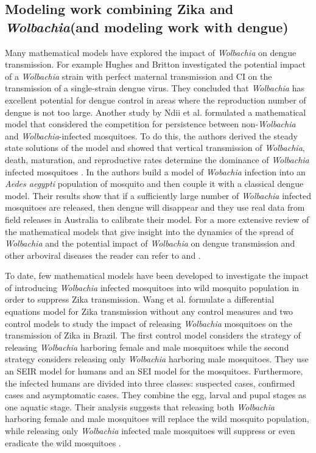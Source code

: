 \documentclass{ws-rv9x6}
\begin{document}
\subsection{Modeling work combining Zika and \textit{Wolbachia}(and modeling work with dengue)}
Many mathematical models have explored the impact of \textit{Wolbachia} on dengue transmission. For example Hughes and Britton \cite{hughes2013modelling} investigated the potential impact of a \textit{Wolbachia} strain with perfect maternal transmission and CI on the transmission of a single-strain dengue virus. They concluded that \textit{Wolbachia} has excellent potential for dengue control in areas where the reproduction number of dengue is not too large. Another study by Ndii et al. formulated a mathematical model that considered the competition for persistence between non-\textit{Wolbachia} and \textit{Wolbachia}-infected mosquitoes. To do this, the authors derived the steady state solutions of the model and showed that vertical transmission of \textit{Wolbachia}, death, maturation, and reproductive rates determine the dominance of \textit{Wolbachia} infected mosquitoes \cite{ndii2012modelling}. In \cite{koiller2014aedes} the authors build a model of \textit{Wobachia} infection into an \textit{Aedes aegypti} population of mosquito and then couple it with a classical dengue model. Their results show that if a sufficiently large number of \textit{Wolbachia} infected mosquitoes are released, then dengue will disappear and they use real data from field releases in Australia to calibrate their model. For a more extensive review of the mathematical models that give insight into the dynamics of the spread of \textit{Wolbachia} and the potential impact of \textit{Wolbachia} on dengue transmission and other arboviral diseases the reader can refer to \cite{dorigatti2018using} and \cite{ogunlade2021review}.

To date, few mathematical models have been developed to investigate the impact of introducing \textit{Wolbachia} infected mosquitoes into wild mosquito population in order to suppress Zika transmission. Wang et al. \cite{wang2017modeling} formulate a differential equations model for Zika transmission without any control measures and two control models to study the impact of releasing \textit{Wolbachia} mosquitoes on the transmission of Zika in Brazil. The first control model considers the strategy of releasing \textit{Wolbachia} harboring female and male mosquitoes while the second strategy considers releasing only \textit{Wolbachia} harboring male mosquitoes.  They use an SEIR model for humans and an SEI model for the mosquitoes. Furthermore, the infected humans are divided into three classes: suspected cases, confirmed cases and asymptomatic cases. They combine the egg, larval and pupal stages as one aquatic stage. Their analysis suggests that releasing both \textit{Wolbachia} harboring female and male mosquitoes will replace the wild mosquito population, while releasing only \textit{Wolbachia} infected male mosquitoes will suppress or even eradicate the wild mosquitoes \cite{wang2017modeling}.
\end{document}
